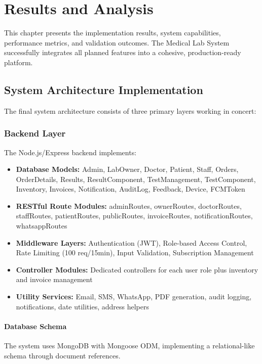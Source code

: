 \documentclass[12pt, a4paper]{report}
\begin{document}
\chapter{Results and Analysis}

This chapter presents the implementation results, system capabilities, performance metrics, and validation outcomes. The Medical Lab System successfully integrates all planned features into a cohesive, production-ready platform.

\section{System Architecture Implementation}

The final system architecture consists of three primary layers working in concert:

\subsection{Backend Layer}
The Node.js/Express backend implements:
\begin{itemize}
    \item \textbf{Database Models:} Admin, LabOwner, Doctor, Patient, Staff, Orders, OrderDetails, Results, ResultComponent, TestManagement, TestComponent, Inventory, Invoices, Notification, AuditLog, Feedback, Device, FCMToken
    \item \textbf{RESTful Route Modules:} adminRoutes, ownerRoutes, doctorRoutes, staffRoutes, patientRoutes, publicRoutes, invoiceRoutes, notificationRoutes, whatsappRoutes
    \item \textbf{Middleware Layers:} Authentication (JWT), Role-based Access Control, Rate Limiting (100 req/15min), Input Validation, Subscription Management
    \item \textbf{Controller Modules:} Dedicated controllers for each user role plus inventory and invoice management
    \item \textbf{Utility Services:} Email, SMS, WhatsApp, PDF generation, audit logging, notifications, date utilities, address helpers
\end{itemize}

\subsubsection{Database Schema}
The system uses MongoDB with Mongoose ODM, implementing a relational-like schema through document references.
\end{document}
